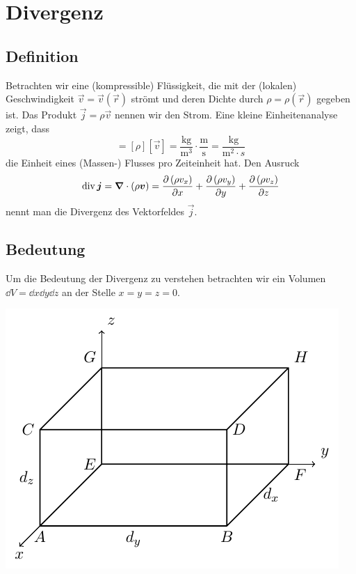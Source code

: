 \documentclass[paper=a4, fontsize=11.0pt, abstractoff, DIV12]{scrartcl}
\begin{document}
\section{Divergenz}

\subsection{Definition}

Betrachten wir eine (kompressible) Flüssigkeit, die mit der (lokalen)
Geschwindigkeit $\vec v= \vec v(\vec r)$ strömt und deren Dichte durch $\rho
= \rho(\vec r)$ gegeben ist. Das Produkt $\vec j = \rho \vec v$ nennen wir den Strom. Eine kleine Einheitenanalyse zeigt, dass
\begin{equation*}
[\vec j] = [\rho][\vec v] = \frac{\mathrm{kg}}{\mathrm{m^3}}\cdot\frac{\mathrm{m}}{\mathrm{s}} = \frac{\mathrm{kg}}{\mathrm{m^2}\cdot{s}}
\end{equation*}
die Einheit eines (Massen-) Flusses pro Zeiteinheit hat. Den Ausruck
\begin{equation}
\div \vec j = \nabla\cdot(\rho \vec v) = \firstpderiv{\left(\rho v_x\right)}{x} + \firstpderiv{\left(\rho v_y\right)}{y} + \firstpderiv{\left(\rho v_z\right)}{z}
\end{equation}
nennt man die Divergenz des Vektorfeldes $\vec j$.

\subsection{Bedeutung}

Um die Bedeutung der Divergenz zu verstehen betrachten wir ein Volumen $\dd V = \dd x \dd y \dd z$ an der Stelle $x=y=z=0$.

\begin{center}
    \includegraphics{Figures/Div}
\end{center}
\end{document}
